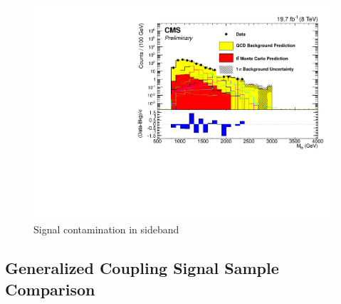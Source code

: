 \begin{figure}[Htcb]
\centering
\includegraphics[width=1.0\textwidth]{AN-13-004/figs/NewMtbSB3semilogwithsignal.pdf}
\caption{Signal contamination in sideband}
\label{figs:sigSB3}
\end{figure}


\subsection{Generalized Coupling Signal Sample Comparison}
\label{sec:sigcont}

